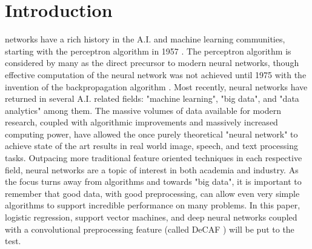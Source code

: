 \documentclass[journal]{IEEEtran}
\begin{document}
\section{Introduction}
 networks have a rich history in the A.I. and machine
learning communities, starting with the perceptron algorithm in 1957 
\cite{Perceptron}. The perceptron algorithm is considered by many as the 
direct precursor to modern neural networks, though effective computation of the
neural network was not achieved until 1975 with the invention of the 
backpropagation algorithm \cite{Backprop}. Most recently, neural networks have
returned in several A.I. related fields: "machine learning", "big data", and 
"data analytics" among them. The massive volumes of data available for modern 
research, coupled with algorithmic improvements and massively increased 
computing power, have allowed the once purely theoretical "neural network" to
achieve state of the art results in real world image, speech, and 
text processing tasks. Outpacing more traditional feature oriented techniques 
in each respective field, neural networks are a topic of interest in both 
academia and industry. As the focus turns away from algorithms and towards 
"big data", it is important to remember that good data, with good
preprocessing, can allow even very simple algorithms to support incredible
performance on many problems. In this paper, logistic regression, 
support vector machines, and deep neural networks coupled with a convolutional
preprocessing feature (called DeCAF \cite{DeCAF}) will be put to the test.
\end{document}
